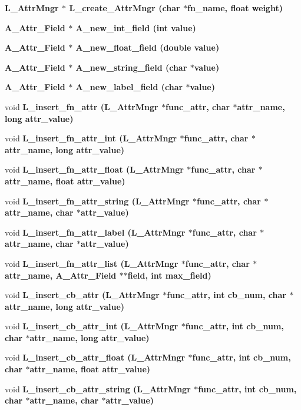 \begin{CompactItemize}
\item 
\bf{L\_\-Attr\-Mngr} $\ast$ \bf{L\_\-create\_\-Attr\-Mngr} (char $\ast$fn\_\-name, float weight)
\item 
\bf{A\_\-Attr\_\-Field} $\ast$ \bf{A\_\-new\_\-int\_\-field} (int value)
\item 
\bf{A\_\-Attr\_\-Field} $\ast$ \bf{A\_\-new\_\-float\_\-field} (double value)
\item 
\bf{A\_\-Attr\_\-Field} $\ast$ \bf{A\_\-new\_\-string\_\-field} (char $\ast$value)
\item 
\bf{A\_\-Attr\_\-Field} $\ast$ \bf{A\_\-new\_\-label\_\-field} (char $\ast$value)
\item 
void \bf{L\_\-insert\_\-fn\_\-attr} (\bf{L\_\-Attr\-Mngr} $\ast$func\_\-attr, char $\ast$attr\_\-name, long attr\_\-value)
\item 
void \bf{L\_\-insert\_\-fn\_\-attr\_\-int} (\bf{L\_\-Attr\-Mngr} $\ast$func\_\-attr, char $\ast$attr\_\-name, long attr\_\-value)
\item 
void \bf{L\_\-insert\_\-fn\_\-attr\_\-float} (\bf{L\_\-Attr\-Mngr} $\ast$func\_\-attr, char $\ast$attr\_\-name, float attr\_\-value)
\item 
void \bf{L\_\-insert\_\-fn\_\-attr\_\-string} (\bf{L\_\-Attr\-Mngr} $\ast$func\_\-attr, char $\ast$attr\_\-name, char $\ast$attr\_\-value)
\item 
void \bf{L\_\-insert\_\-fn\_\-attr\_\-label} (\bf{L\_\-Attr\-Mngr} $\ast$func\_\-attr, char $\ast$attr\_\-name, char $\ast$attr\_\-value)
\item 
void \bf{L\_\-insert\_\-fn\_\-attr\_\-list} (\bf{L\_\-Attr\-Mngr} $\ast$func\_\-attr, char $\ast$attr\_\-name, \bf{A\_\-Attr\_\-Field} $\ast$$\ast$field, int max\_\-field)
\item 
void \bf{L\_\-insert\_\-cb\_\-attr} (\bf{L\_\-Attr\-Mngr} $\ast$func\_\-attr, int cb\_\-num, char $\ast$attr\_\-name, long attr\_\-value)
\item 
void \bf{L\_\-insert\_\-cb\_\-attr\_\-int} (\bf{L\_\-Attr\-Mngr} $\ast$func\_\-attr, int cb\_\-num, char $\ast$attr\_\-name, long attr\_\-value)
\item 
void \bf{L\_\-insert\_\-cb\_\-attr\_\-float} (\bf{L\_\-Attr\-Mngr} $\ast$func\_\-attr, int cb\_\-num, char $\ast$attr\_\-name, float attr\_\-value)
\item 
void \bf{L\_\-insert\_\-cb\_\-attr\_\-string} (\bf{L\_\-Attr\-Mngr} $\ast$func\_\-attr, int cb\_\-num, char $\ast$attr\_\-name, char $\ast$attr\_\-value)
$$
\end{CompactItemize}
